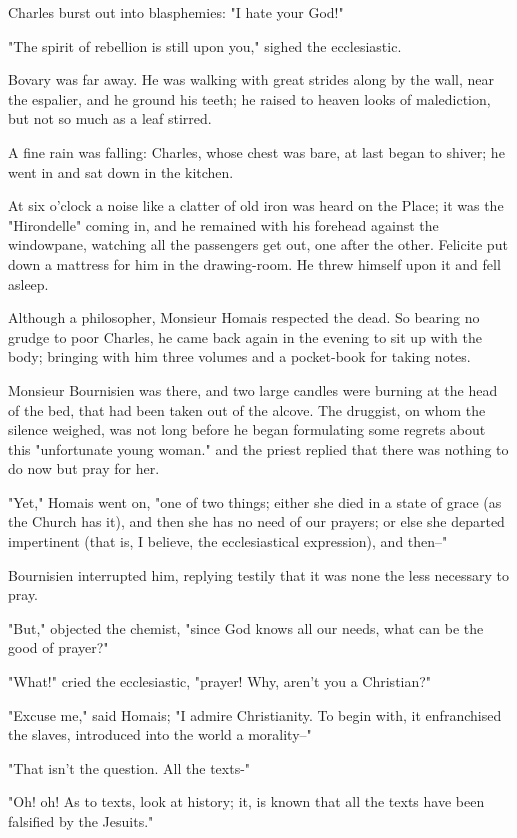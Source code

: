 \documentclass{tufte-book}
\begin{document}
Charles burst out into blasphemies: "I hate your God!"

"The spirit of rebellion is still upon you," sighed the ecclesiastic.

Bovary was far away. He was walking with great strides along by the
wall, near the espalier, and he ground his teeth; he raised to heaven
looks of malediction, but not so much as a leaf stirred.

A fine rain was falling: Charles, whose chest was bare, at last began to
shiver; he went in and sat down in the kitchen.

At six o'clock a noise like a clatter of old iron was heard on the
Place; it was the "Hirondelle" coming in, and he remained with his
forehead against the windowpane, watching all the passengers get
out, one after the other. Felicite put down a mattress for him in the
drawing-room. He threw himself upon it and fell asleep.

Although a philosopher, Monsieur Homais respected the dead. So bearing
no grudge to poor Charles, he came back again in the evening to sit up
with the body; bringing with him three volumes and a pocket-book for
taking notes.

Monsieur Bournisien was there, and two large candles were burning at the
head of the bed, that had been taken out of the alcove. The druggist, on
whom the silence weighed, was not long before he began formulating some
regrets about this "unfortunate young woman." and the priest replied
that there was nothing to do now but pray for her.

"Yet," Homais went on, "one of two things; either she died in a state of
grace (as the Church has it), and then she has no need of our prayers;
or else she departed impertinent (that is, I believe, the ecclesiastical
expression), and then--"

Bournisien interrupted him, replying testily that it was none the less
necessary to pray.

"But," objected the chemist, "since God knows all our needs, what can be
the good of prayer?"

"What!" cried the ecclesiastic, "prayer! Why, aren't you a Christian?"

"Excuse me," said Homais; "I admire Christianity. To begin with, it
enfranchised the slaves, introduced into the world a morality--"

"That isn't the question. All the texts-"

"Oh! oh! As to texts, look at history; it, is known that all the texts
have been falsified by the Jesuits."
\end{document}

